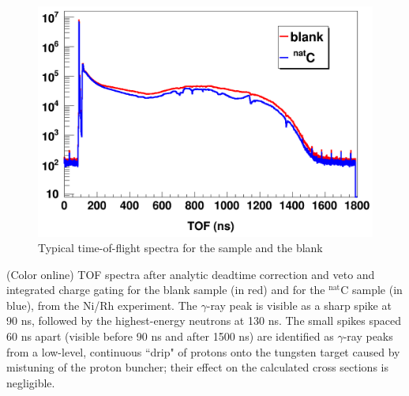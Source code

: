\begin{figure}
    \includegraphics[scale=0.3]{figures/exampleTOFSpectrum.png}
    \caption{Typical time-of-flight spectra for the \cNat sample and the blank}
    \label{ExampleTOFSpectrum}
\end{figure}

(Color online) TOF spectra after analytic deadtime correction and
        veto and integrated charge gating for the blank sample (in
        red) and for the $^{\text{nat}}$C sample (in blue), from the Ni/Rh experiment.
        The $\gamma$-ray peak is visible as a sharp spike at 90 ns, followed by
        the highest-energy neutrons at 130 ns. The small spikes spaced 60 ns
        apart (visible before 90 ns and after 1500
        ns) are identified as $\gamma$-ray peaks from a low-level, continuous ``drip" 
        of protons onto the tungsten target caused by mistuning of the proton 
        buncher; their effect on the calculated cross sections is negligible.

